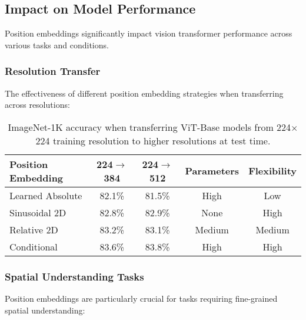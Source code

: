 \subsection{Impact on Model Performance}

Position embeddings significantly impact vision transformer performance across various tasks and conditions.

\subsubsection{Resolution Transfer}

The effectiveness of different position embedding strategies when transferring across resolutions:

\begin{table}[htbp]
\centering
\begin{tabular}{lcccc}
\toprule
\textbf{Position Embedding} & \textbf{224$\rightarrow$384} & \textbf{224$\rightarrow$512} & \textbf{Parameters} & \textbf{Flexibility} \\
\midrule
Learned Absolute & 82.1\% & 81.5\% & High & Low \\
Sinusoidal 2D & 82.8\% & 82.9\% & None & High \\
Relative 2D & 83.2\% & 83.1\% & Medium & Medium \\
Conditional & 83.6\% & 83.8\% & High & High \\
\bottomrule
\end{tabular}
\caption{ImageNet-1K accuracy when transferring ViT-Base models from 224$\times$224 training resolution to higher resolutions at test time.}
\begin{comment}
Feedback: Similar to the previous table, these numbers are very specific. It's better to cite the source or make it clear these are illustrative. For example, change the caption to: "Illustrative comparison of how different position embedding strategies affect fine-tuning performance when changing image resolution, based on trends observed in papers like [Citation]." This avoids presenting specific numbers as universal truths.
\end{comment}
\end{table}

\subsubsection{Spatial Understanding Tasks}

Position embeddings are particularly crucial for tasks requiring fine-grained spatial understanding:

